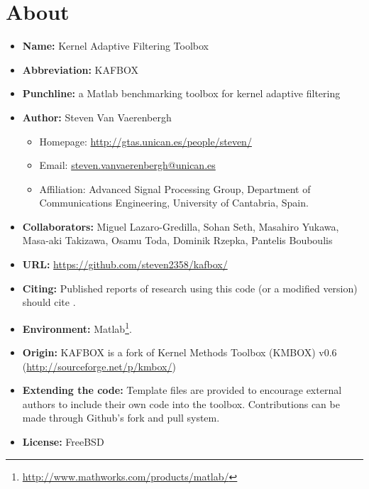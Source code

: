 \documentclass[]{report}
\begin{document}


\chapter{About}
\begin{itemize}
\item {\bf Name:} Kernel Adaptive Filtering Toolbox
\item {\bf Abbreviation:} KAFBOX
\item {\bf Punchline:} a Matlab benchmarking toolbox for kernel adaptive filtering
\item {\bf Author:} Steven Van Vaerenbergh
  \begin{itemize}
  \item Homepage: \url{http://gtas.unican.es/people/steven/}
  \item Email: \url{steven.vanvaerenbergh@unican.es}
  \item Affiliation: Advanced Signal Processing Group, Department of Communications Engineering, University of Cantabria, Spain.
  \end{itemize}
\item {\bf Collaborators:} Miguel Lazaro-Gredilla, Sohan Seth, Masahiro Yukawa, Masa-aki Takizawa, Osamu Toda, Dominik Rzepka, Pantelis Bouboulis
\item {\bf URL:} \url{https://github.com/steven2358/kafbox/}
\item {\bf Citing:} Published reports of research using this code (or a modified version) should cite \cite{vanvaerenbergh2013comparative}.
\item {\bf Environment:} Matlab\footnote{\url{http://www.mathworks.com/products/matlab/}}.
\item {\bf Origin:} KAFBOX is a fork of Kernel Methods Toolbox (KMBOX) v0.6 (\url{http://sourceforge.net/p/kmbox/})
\item {\bf Extending the code:} Template files are provided to encourage external authors to include their own code into the toolbox. Contributions can be made through Github's fork and pull system.
\item {\bf License:} FreeBSD
\end{itemize}





\end{document}
